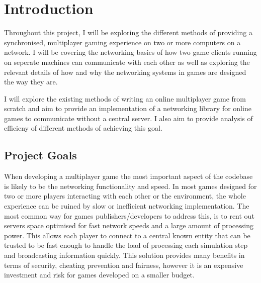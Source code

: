 \chapter{Introduction}
Throughout this project, I will be exploring the different methods of providing a synchronised, multiplayer gaming experience on two or more computers on a network. I will be covering the networking basics of how two game clients running on seperate machines can communicate with each other as well as exploring the relevant details of how and why the networking systems in games are designed the way they are.


I will explore the existing methods of writing an online multiplayer game from scratch and aim to provide an implementation of a networking library for online games to communicate without a central server. I also aim to provide analysis of efficieny of different methods of achieving this goal.

\section{Project Goals}
When developing a multiplayer game the most important aspect of the codebase is likely to be the networking functionality and speed. In most games designed for two or more players interacting with each other or the environment, the whole experience can be ruined by slow or inefficient networking implementation. The most common way for games publishers/developers to address this, is to rent out servers space optimised for fast network speeds and a large amount of processing power. This allows each player to connect to a central known entity that can be trusted to be fast enough to handle the load of processing each simulation step and broadcasting information quickly. This solution provides many benefits in terms of security, cheating prevention and fairness, however it is an expensive investment and risk for games developed on a smaller budget.

